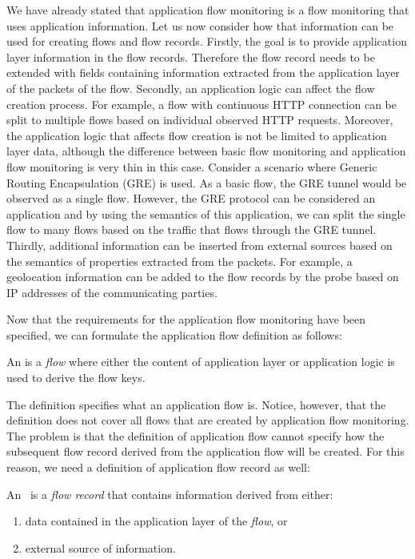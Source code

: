 We have already stated that application flow monitoring is a flow monitoring that uses application information. Let us now consider how that information can be used for creating flows and flow records. Firstly, the goal is to provide application layer information in the flow records. Therefore the flow record needs to be extended with fields containing information extracted from the application layer of the packets of the flow. Secondly, an application logic can affect the flow creation process. For example, a flow with continuous HTTP connection can be split to multiple flows based on individual observed HTTP requests. Moreover, the application logic that affects flow creation is not be limited to application layer data, although the difference between basic flow monitoring and application flow monitoring is very thin in this case. Consider a scenario where Generic Routing Encapsulation (GRE) is used. As a basic flow, the GRE tunnel would be observed as a single flow. However, the GRE protocol can be considered an application and by using the semantics of this application, we can split the single flow to many flows based on the traffic that flows through the GRE tunnel. Thirdly, additional information can be inserted from external sources based on the semantics of properties extracted from the packets. For example, a geolocation information can be added to the flow records by the probe based on IP addresses of the communicating parties.

Now that the requirements for the application flow monitoring have been specified, we can formulate the application flow definition as follows:

\begin{definition}\label{def:application-flow}

    An \emph{} is a \emph{flow} where either
    the content of application layer or application logic is used
    to derive the flow keys.

\end{definition}

The definition specifies what an application flow is. Notice, however, that the definition does not cover all flows that are created by application flow monitoring. The problem is that the definition of application flow cannot specify how the subsequent flow record derived from the application flow will be created. For this reason, we need a definition of application flow record as well:

\begin{definition}\label{def:application-flow-record}

    An~\emph{} is a \emph{flow record} 
    that contains information derived from either:

    \begin{enumerate}
        \item data contained in the application layer of the \emph{flow}, or
        \item external source of information.
    \end{enumerate}
        
\end{definition}

